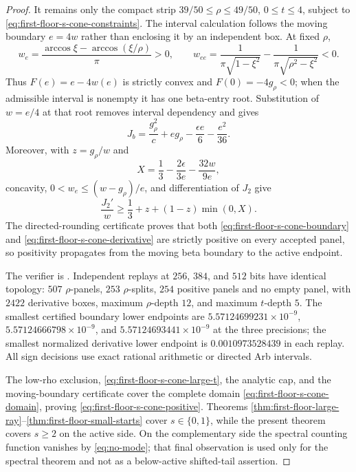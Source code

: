 \documentclass[11pt]{article}
\theoremstyle{remark}
\begin{document}
\begin{proof}
It remains only the compact strip
$39/50\leq\rho\leq49/50$, $0\leq t\leq4$, subject to
\eqref{eq:first-floor-s-cone-constraints}.  The interval calculation follows
the moving boundary $e=4w$ rather than enclosing it by an independent box.
At fixed $\rho$,
\[
 w_e=\frac{\arccos\xi-\arccos(\xi/\rho)}\pi>0,
 \qquad
 w_{ee}=\frac1{\pi\sqrt{1-\xi^2}}
 -\frac1{\pi\sqrt{\rho^2-\xi^2}}<0.
\]
Thus $F(e)=e-4w(e)$ is strictly convex and $F(0)=-4g_\rho<0$; when the
admissible interval is nonempty it has one beta-entry root.  Substitution
of $w=e/4$ at that root removes interval dependency and gives
\begin{equation}
 J_b=\frac{g_\rho^2}{c}+eg_\rho
 -\frac{\epsilon e}{6}-\frac{e^2}{36}.
 \label{eq:first-floor-s-cone-boundary}
\end{equation}
Moreover, with $z=g_\rho/w$ and
\[
 X=\frac13-\frac{2\epsilon}{3e}-\frac{32w}{9e},
\]
concavity, $0<w_e\leq(w-g_\rho)/e$, and differentiation of $J_2$ give
\begin{equation}
 \frac{J_2'}w\geq
 \frac13+z+(1-z)\min(0,X).
 \label{eq:first-floor-s-cone-derivative}
\end{equation}
The directed-rounding certificate proves that both
\eqref{eq:first-floor-s-cone-boundary} and
\eqref{eq:first-floor-s-cone-derivative} are strictly positive on every
accepted panel, so positivity propagates from the moving beta boundary to
the active endpoint.

The verifier is
.  Independent replays
at $256$, $384$, and $512$ bits have identical topology: $507$
$\rho$-panels, $253$ $\rho$-splits, $254$ positive panels and no empty
panel, with $2422$ derivative boxes, maximum $\rho$-depth $12$, and maximum
$t$-depth $5$.
The smallest certified boundary lower endpoints are
$5.57124699231\times10^{-9}$, $5.57124666798\times10^{-9}$, and
$5.57124693441\times10^{-9}$ at the three precisions; the smallest
normalized derivative lower endpoint is $0.0010973528439$ in each replay.
All sign decisions use exact rational arithmetic or directed Arb intervals.

The low-rho exclusion, \eqref{eq:first-floor-s-cone-large-t}, the analytic
cap, and the moving-boundary certificate cover the complete domain
\eqref{eq:first-floor-s-cone-domain}, proving
\eqref{eq:first-floor-s-cone-positive}.  Theorems
\ref{thm:first-floor-large-ray}--\ref{thm:first-floor-small-starts} cover
$s\in\{0,1\}$, while the present theorem covers $s\geq2$ on the active
side.  On the complementary side the spectral counting function vanishes
by \eqref{eq:no-mode}; that final observation is used only for the spectral
theorem and not as a below-active shifted-tail assertion.
\end{proof}
\end{document}
